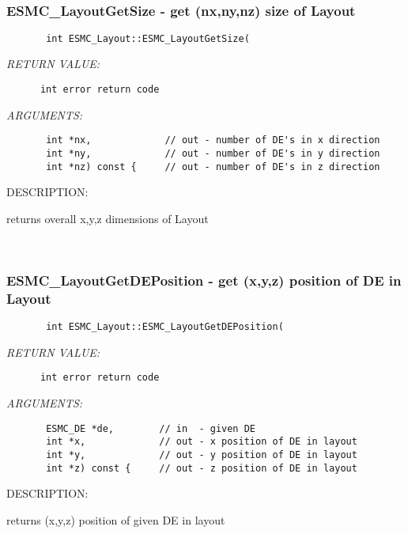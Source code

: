 \mbox{}\hrulefill\ 
 
\subsubsection{ESMC\_LayoutGetSize - get (nx,ny,nz) size of Layout}


  
\begin{verbatim}       int ESMC_Layout::ESMC_LayoutGetSize(\end{verbatim}{\em RETURN VALUE:}
\begin{verbatim}      int error return code\end{verbatim}{\em ARGUMENTS:}
\begin{verbatim}       int *nx,             // out - number of DE's in x direction
       int *ny,             // out - number of DE's in y direction
       int *nz) const {     // out - number of DE's in z direction\end{verbatim}
{\sf DESCRIPTION:\\ }


      returns overall x,y,z dimensions of Layout
   
 
\mbox{}\hrulefill\ 
 
\subsubsection{ESMC\_LayoutGetDEPosition - get (x,y,z) position of DE in Layout}


  
\begin{verbatim}       int ESMC_Layout::ESMC_LayoutGetDEPosition(\end{verbatim}{\em RETURN VALUE:}
\begin{verbatim}      int error return code\end{verbatim}{\em ARGUMENTS:}
\begin{verbatim}       ESMC_DE *de,        // in  - given DE
       int *x,             // out - x position of DE in layout
       int *y,             // out - y position of DE in layout
       int *z) const {     // out - z position of DE in layout\end{verbatim}
{\sf DESCRIPTION:\\ }


      returns (x,y,z) position of given DE in layout
   
